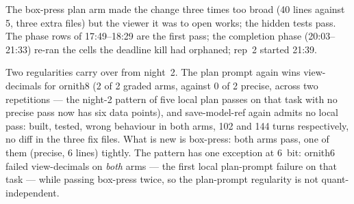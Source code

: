 \begin{table}[htbp]
\centering
\small
\caption{Ornith8 by task, prompt and repetition (minutes, turns where recorded; 20/15/25/40\,min deadlines;
lines are changed lines in the fix files against the landed fix).}\label{tab:splits}

\smallskip\footnotesize
The box-press plan arm made the change three times too broad (40 lines against 5, three extra files) but the
viewer it was to open works; the hidden tests pass. The phase rows of 17:49--18:29 are the first pass; the
completion phase (20:03--21:33) re-ran the cells the deadline kill had orphaned; rep~2 started 21:39.
\end{table}

Two regularities carry over from night~2. The plan prompt again wins view-decimals for ornith8 (2 of 2 graded
arms, against 0 of 2 precise, across two repetitions --- the night-2 pattern of five local plan passes on that
task with no precise pass now has six data points), and save-model-ref again admits no local pass: built, tested,
wrong behaviour in both arms, 102 and 144 turns respectively, no diff in the three fix files. What is new is
box-press: both arms pass, one of them (precise, 6 lines) tightly. The pattern has one exception at 6~bit:
ornith6 failed view-decimals on \emph{both} arms --- the first local plan-prompt failure on that task --- while
passing box-press twice, so the plan-prompt regularity is not quant-independent.

